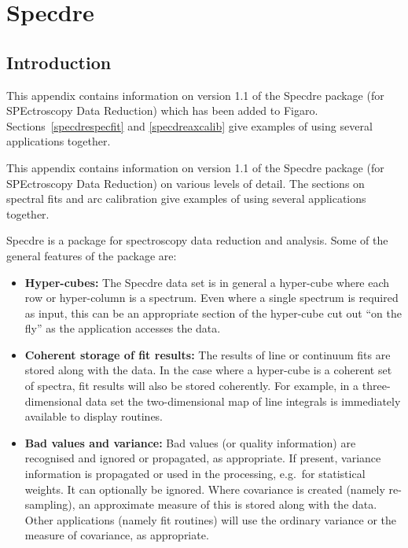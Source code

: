 \documentclass[11pt,twoside]{article}
\newcommand{\stardocinitials}  {SUN}
\newcommand{\stardocnumber}    {86.21}
\newcommand{\stardocname}{\stardocinitials /\stardocnumber}
\newenvironment{latexonly}{}{}
\newcommand{\htmlref}[2]{#1}
\newcommand{\xlabel}[1]{}
\begin{document}

\newpage %
\section{\label{specdre}\xlabel{specdre}Specdre}
\markboth{Specdre}{\stardocname}

\subsection{\label{specdreintro}\xlabel{specdreintro}Introduction}

\begin{latexonly}
   This appendix contains information on version 1.1 of the Specdre
   package (for SPEctroscopy Data Reduction) which has been added to Figaro.
   Sections~\ref{specdrespecfit} and \ref{specdreaxcalib}
   give examples of using several applications together.
\end{latexonly}

\begin{htmlonly}
   This appendix contains information on version 1.1 of the Specdre
   package (for SPEctroscopy Data Reduction) on various levels of
   detail. The sections on
\htmlref{spectral fits}{specfit}
   and
\htmlref{arc calibration}{axcalib}
   give examples of using several applications together.
\end{htmlonly}

   Specdre is a package for spectroscopy data reduction and analysis.
   Some of the general features of the package are:

\begin{itemize}
\item {\bf Hyper-cubes:} The Specdre data set is in general a hyper-cube
   where each row or hyper-column is a spectrum. Even where a single
   spectrum is required as input, this can be an appropriate section of
   the hyper-cube cut out ``on the fly'' as the application accesses the
   data.
\item {\bf Coherent storage of fit results:} The results of line or
   continuum fits are stored along with the data. In the case where a
   hyper-cube is a coherent set of spectra, fit results will also be
   stored coherently. For example, in a three-dimensional data set the
   two-dimensional map of line integrals is immediately available to
   display routines.
\item {\bf Bad values and variance:} Bad values (or quality information)
   are recognised and ignored or propagated, as appropriate. If present,
   variance information is propagated or used in the processing,
   e.g.\ for statistical weights. It can optionally be ignored. Where
   covariance is created (namely re-sampling), an approximate measure of
   this is stored along with the data. Other applications (namely fit
   routines) will use the ordinary variance or the measure of
   covariance, as appropriate.
\end{itemize}
\end{document}
